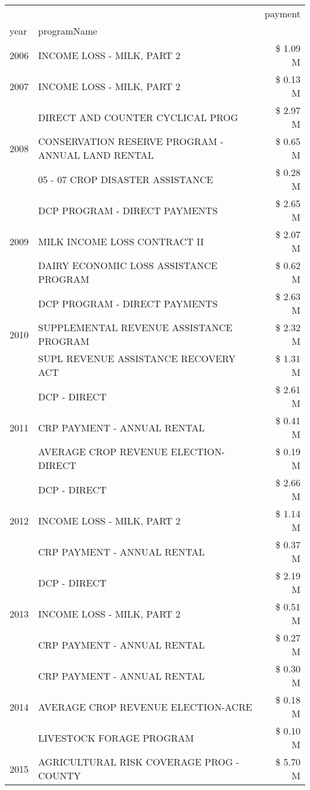 \begin{tabular}{llr}
\toprule
 &  & payment \\
year & programName &  \\
\midrule
2006 & INCOME LOSS - MILK, PART 2 & \$ 1.09 M \\
\cline{1-3}
2007 & INCOME LOSS - MILK, PART 2 & \$ 0.13 M \\
\cline{1-3}
\multirow[t]{3}{*}{2008} & DIRECT AND COUNTER CYCLICAL PROG & \$ 2.97 M \\
 & CONSERVATION RESERVE PROGRAM - ANNUAL LAND RENTAL & \$ 0.65 M \\
 & 05 - 07 CROP DISASTER ASSISTANCE & \$ 0.28 M \\
\cline{1-3}
\multirow[t]{3}{*}{2009} & DCP PROGRAM - DIRECT PAYMENTS & \$ 2.65 M \\
 & MILK INCOME LOSS CONTRACT II & \$ 2.07 M \\
 & DAIRY ECONOMIC LOSS ASSISTANCE PROGRAM & \$ 0.62 M \\
\cline{1-3}
\multirow[t]{3}{*}{2010} & DCP PROGRAM - DIRECT PAYMENTS & \$ 2.63 M \\
 & SUPPLEMENTAL REVENUE ASSISTANCE PROGRAM & \$ 2.32 M \\
 & SUPL REVENUE ASSISTANCE RECOVERY ACT & \$ 1.31 M \\
\cline{1-3}
\multirow[t]{3}{*}{2011} & DCP - DIRECT & \$ 2.61 M \\
 & CRP PAYMENT - ANNUAL RENTAL & \$ 0.41 M \\
 & AVERAGE CROP REVENUE ELECTION-DIRECT & \$ 0.19 M \\
\cline{1-3}
\multirow[t]{3}{*}{2012} & DCP - DIRECT & \$ 2.66 M \\
 & INCOME LOSS - MILK, PART 2 & \$ 1.14 M \\
 & CRP PAYMENT - ANNUAL RENTAL & \$ 0.37 M \\
\cline{1-3}
\multirow[t]{3}{*}{2013} & DCP - DIRECT & \$ 2.19 M \\
 & INCOME LOSS - MILK, PART 2 & \$ 0.51 M \\
 & CRP PAYMENT - ANNUAL RENTAL & \$ 0.27 M \\
\cline{1-3}
\multirow[t]{3}{*}{2014} & CRP PAYMENT - ANNUAL RENTAL & \$ 0.30 M \\
 & AVERAGE CROP REVENUE ELECTION-ACRE & \$ 0.18 M \\
 & LIVESTOCK FORAGE PROGRAM & \$ 0.10 M \\
\cline{1-3}
\multirow[t]{3}{*}{2015} & AGRICULTURAL RISK COVERAGE PROG - COUNTY & \$ 5.70 M \\

\end{tabular}
